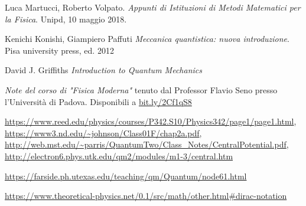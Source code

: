 \clearpage
\begin{thebibliography}{9}

Luca Martucci, Roberto Volpato.
\textit{Appunti di Istituzioni di Metodi Matematici per la Fisica}. 
Unipd, 10 maggio 2018.
 
Kenichi Konishi, Giampiero Paffuti
\textit{Meccanica quantistica: nuova introduzione}.
Pisa university press, ed. 2012

David J. Griffiths
\textit{Introduction to Quantum Mechanics}

\textit{Note del corso di "Fisica Moderna"} tenuto dal Professor Flavio Seno presso l'Università di Padova.
Disponibili a \url{bit.ly/2Cf1qS8}

\url{https://www.reed.edu/physics/courses/P342.S10/Physics342/page1/page1.html},
\url{https://www3.nd.edu/~johnson/Class01F/chap2a.pdf}, \url{http://web.mst.edu/~parris/QuantumTwo/Class_Notes/CentralPotential.pdf},
\url{http://electron6.phys.utk.edu/qm2/modules/m1-3/central.htm}

\url{https://farside.ph.utexas.edu/teaching/qm/Quantum/node61.html}

\url{https://www.theoretical-physics.net/0.1/src/math/other.html#dirac-notation}

\end{thebibliography}

\printindex